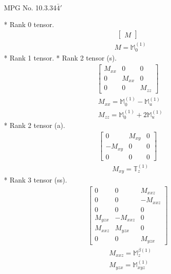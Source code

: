 \documentclass[fleqn,8pt,landscape]{jsarticle}
\begin{document}
\setcounter{MaxMatrixCols}{32}

\renewcommand{\tablename}{Table~}
\renewcommand{\figurename}{Figure~}
\begin{center}
\LARGE
MPG No. 10.3.34\quad$\bar{4}'$
\end{center}
* Rank 0 tensor.
\begin{align*}
\begin{bmatrix} M \end{bmatrix}
\end{align*}
\begin{align*}
& M = \mathbb{M}_{0}^{(1)}
\end{align*}
* Rank 1 tensor.
* Rank 2 tensor (s).
\begin{align*}
\begin{bmatrix} M_{xx} & 0 & 0 \\ 0 & M_{xx} & 0 \\ 0 & 0 & M_{zz} \end{bmatrix}
\end{align*}
\begin{align*}
& M_{xx} = \mathbb{M}_{0}^{(1)} - \mathbb{M}_{u}^{(1)} \\
& M_{zz} = \mathbb{M}_{0}^{(1)} + 2 \mathbb{M}_{u}^{(1)}
\end{align*}
* Rank 2 tensor (a).
\begin{align*}
\begin{bmatrix} 0 & M_{xy} & 0 \\ - M_{xy} & 0 & 0 \\ 0 & 0 & 0 \end{bmatrix}
\end{align*}
\begin{align*}
& M_{xy} = \mathbb{T}_{z}^{(1)}
\end{align*}
* Rank 3 tensor (ss).
\begin{align*}
\begin{bmatrix} 0 & 0 & M_{xxz} \\ 0 & 0 & - M_{xxz} \\ 0 & 0 & 0 \\ M_{yzx} & - M_{xxz} & 0 \\ M_{xxz} & M_{yzx} & 0 \\ 0 & 0 & M_{yzx} \end{bmatrix}
\end{align*}
\begin{align*}
& M_{xxz} = \mathbb{M}_{z}^{\beta(1)} \\
& M_{yzx} = \mathbb{M}_{xyz}^{(1)}
\end{align*}
\end{document}
